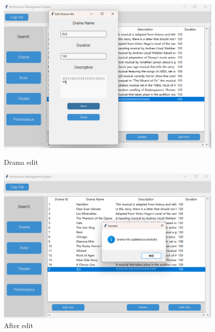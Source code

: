 \documentclass[12pt]{article}
\begin{document}
\begin{figure}[H]
    \centering
    \begin{minipage}{0.48\textwidth}
        \centering
        \includegraphics[width=\textwidth]{29.png}
        \caption{Drama edit} 
        \label{Figure 29}
    \end{minipage}
    \hfill
    \begin{minipage}{0.48\textwidth}
        \centering
        \includegraphics[width=\textwidth]{30.png}
        \caption{After edit}
        \label{Figure 30}
    \end{minipage}
\end{figure}
\end{document}
